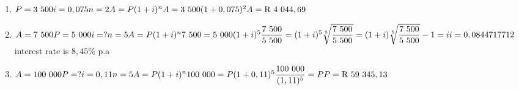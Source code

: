  \begin{solutions}{}{
\begin{enumerate}[itemsep=5pt, label=\textbf{\arabic*}. ] 


\item $P = 3~500\\
i=0,075\\
n=2\\
A=P(1 + i)^{n}\\
A = 3~500(1 + 0,075)^{2}\\
A = \mbox{R }4~044,69$
\item $A = 7~500\\
P = 5~000\\
i=?\\
n=5\\
A=P(1 + i)^{n}\\
7~500 = 5~000(1 + i)^{5}\\[4pt]
\dfrac{7~500}{5~500} = (1+i)^5\\[4pt]
\sqrt[5]{\dfrac{7~500}{5~500}} = (1+i)\\[4pt]
\sqrt[5]{\dfrac{7~500}{5~500}} - 1 = i\\[4pt]
i = 0,0844717712$\\
interest rate is $8,45 \%$ p.a
\item $A = 100~000\\
P=?\\
i=0,11\\
n=5\\
A=P(1 + i)^{n}\\
100~000 = P(1 + 0,11)^{5}\\[4pt]
\dfrac{100~000}{(1,11)^5} = P\\[4pt]
P = \mbox{R }59~345,13$

\end{enumerate}
}
\end{solutions}

